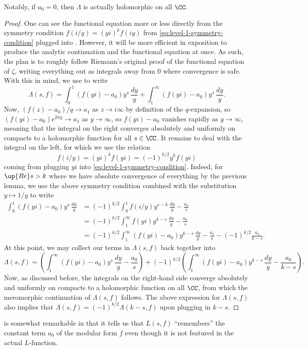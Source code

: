 \documentclass{amsart}
\begin{document}
Notably, if $a_0=0$, then $\Lambda$ is actually holomorphic on all $\CC$.
\begin{proof}
	One can see the functional equation more or less directly from the symmetry condition $f(i/y)=(yi)^kf(iy)$ from \eqref{eq:level-1-symmetry-condition} plugged into . However, it will be more efficient in exposition to produce the analytic continuation and the functional equation at once. As such, the plan is to roughly follow Riemann's original proof of the functional equation of $\zeta$, writing everything out as integrals away from $0$ where convergence is safe. With this in mind, we use  to write
	\[\Lambda(s,f)=\int_0^1(f(yi)-a_0)y^s\,\frac{dy}y+\int_1^\infty(f(yi)-a_0)y^s\,\frac{dy}y.\]
	Now, $(f(z)-a_0)/q\to a_1$ as $z\to i\infty$ by definition of the $q$-expansion, so $(f(yi)-a_0)e^{2\pi y}\to a_1$ as $y\to\infty$, so $f(yi)-a_0$ vanishes rapidly as $y\to\infty$, meaning that the integral on the right converges absolutely and uniformly on compacts to a holomorphic function for all $s\in\CC$. It remains to deal with the integral on the left, for which we use the relation
	\[f(i/y)=(yi)^kf(yi)=(-1)^{k/2}y^kf(yi)\]
	coming from plugging $yi$ into \eqref{eq:level-1-symmetry-condition}. Indeed, for $\op{Re}s>k$ where we have absolute convergence of everything by the previous lemma, we use the above symmetry condition combined with the substitution $y\mapsto1/y$ to write
	\begin{align*}
		\int_0^1(f(yi)-a_0)y^s\,\frac{dy}y &= (-1)^{k/2}\int_0^1f(i/y)y^{s-k}\,\frac{dy}y-\frac{a_0}s \\
		&= (-1)^{k/2}\int_1^\infty f(yi)y^{k-s}\,\frac{dy}y-\frac{a_0}s \\
		&= (-1)^{k/2}\int_1^\infty(f(yi)-a_0)y^{k-s}\,\frac{dy}y-\frac{a_0}s-(-1)^{k/2}\frac{a_0}{k-s}.
	\end{align*}
	At this point, we may collect our terms in $\Lambda(s,f)$ back together into
	\[\Lambda(s,f)=\left(\int_1^\infty(f(yi)-a_0)y^s\,\frac{dy}y-\frac{a_0}s\right)+(-1)^{k/2}\left(\int_1^\infty(f(yi)-a_0)y^{k-s}\,\frac{dy}y-\frac{a_0}{k-s}\right).\]
	Now, as discussed before, the integrals on the right-hand side converge absolutely and uniformly on compacts to a holomorphic function on all $\CC$, from which the meromorphic continuation of $\Lambda(s,f)$ follows. The above expression for $\Lambda(s,f)$ also implies that $\Lambda(s,f)=(-1)^{k/2}\Lambda(k-s,f)$ upon plugging in $k-s$.
\end{proof}
\begin{remark}
	 is somewhat remarkable in that it tells us that $L(s,f)$ ``remembers'' the constant term $a_0$ of the modular form $f$ even though it is not featured in the actual $L$-function.
\end{remark}
\end{document}

